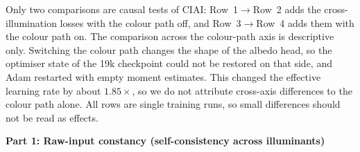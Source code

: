 Only two comparisons are causal tests of CIAI: Row~1$\rightarrow$Row~2 adds the
cross-illumination losses with the colour path off, and Row~3$\rightarrow$Row~4 adds them
with the colour path on. The comparison across the colour-path axis is descriptive only.
Switching the colour path changes the shape of the albedo head, so the optimiser state of the
19k checkpoint could not be restored on that side, and Adam restarted with empty moment
estimates. This changed the effective learning rate by about $1.85\times$, so we do not
attribute cross-axis differences to the colour path alone. All rows are single training runs,
so small differences should not be read as effects.

\begin{table}[p]
  \caption[CIAI ablation across constancy and accuracy.]{%
    The $2\times2$ CIAI ablation. All rows start from the same 19k checkpoint and train to
    40k; Row~1$\rightarrow$Row~2 and Row~3$\rightarrow$Row~4 are the matched comparisons.
    Part~1: stability on raw inputs, with ARAP on the $16$/$11$ colour-varying groups of
    . Part~2a: MAW accuracy, ARAP accuracy on white-balanced
    inputs, and IIW. Part~2b: ARAP accuracy on raw inputs. All ARAP columns use the
    evaluation mask of .
    Lower is better everywhere except ARAP SSIM. Best per column is \textbf{bold}.
     shows the corresponding albedo and variation maps.
  }
  \label{tab:ablation}
  \centering
  \textbf{\small Part 1: Raw-input constancy (self-consistency across illuminants)}\\[2pt]
\end{table}
